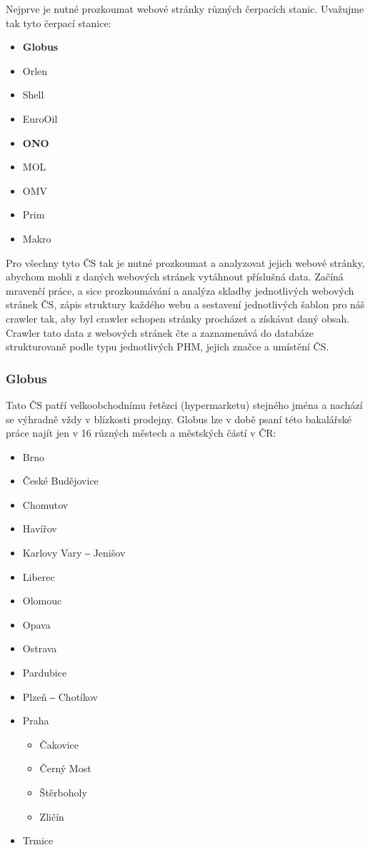 Nejprve je nutné prozkoumat webové stránky různých čerpacích stanic.
Uvažujme tak tyto čerpací stanice:

\begin{itemize}
    \item \textbf{Globus}
    \item Orlen
    \item Shell
    \item EuroOil
    \item \textbf{ONO}
    \item MOL
    \item OMV
    \item Prim
    \item Makro
\end{itemize}

Pro všechny tyto ČS tak je nutné prozkoumat a analyzovat jejich webové
stránky, abychom mohli z daných webových stránek vytáhnout příslušná data.
Začíná mravenčí práce, a sice prozkoumávání a analýza skladby jednotlivých
webových stránek ČS, zápis struktury každého webu a sestavení jednotlivých
šablon pro náš crawler tak, aby byl crawler schopen stránky procházet
a získávat daný obsah. Crawler tato data z webových stránek čte a zaznamenává
do databáze strukturovaně podle typu jednotlivých PHM, jejich značce
a umístění ČS.

\subsubsection{Globus}

Tato ČS patří velkoobchodnímu řetězci (hypermarketu) stejného jména
a nachází se výhradně vždy v blízkosti prodejny. Globus lze v době
psaní této bakalářské práce najít jen v 16 různých městech a městských
částí v ČR:

\begin{itemize}
    \item Brno
    \item České Budějovice
    \item Chomutov
    \item Havířov
    \item Karlovy Vary ‒ Jenišov
    \item Liberec
    \item Olomouc
    \item Opava
    \item Ostrava
    \item Pardubice
    \item Plzeň ‒ Chotíkov
    \item Praha
    \begin{itemize}
        \item Čakovice
        \item Černý Most
        \item Štěrboholy
        \item Zličín
    \end{itemize}
    \item Trmice
\end{itemize}

